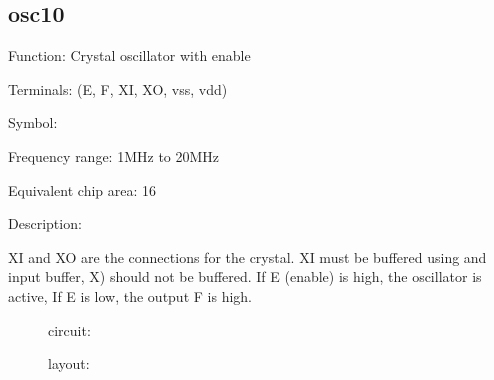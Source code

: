 \subsection{osc10}

Function: Crystal oscillator with enable

Terminals: (E, F, XI, XO, vss, vdd)


Symbol:
\begin{figure}[bth]
\end{figure}

Frequency range: 1MHz to 20MHz

Equivalent chip area: 16



Description:

XI and XO are the connections for the crystal.
XI must be buffered using and input buffer, X) should not be buffered.
If E (enable) is high, the oscillator is active, If E is low, the output F is
high.  

\clearpage

\begin{figure}[bht]
circuit:\\

\end{figure}

\vspace{1cm}

\begin{figure}[bht]
layout:\\

\end{figure}
\clearpage



